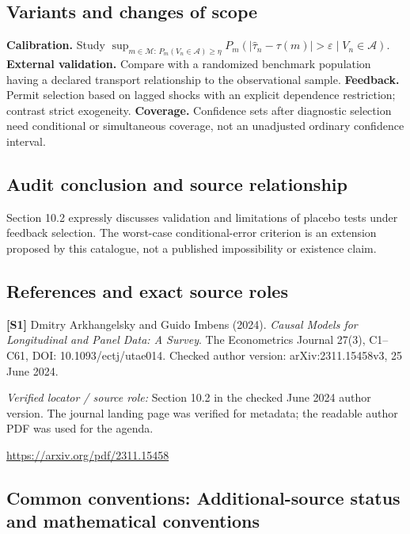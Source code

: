 \documentclass[11pt,a4paper]{article}
\begin{document}
\subsection*{Variants and changes of scope}

\textbf{Calibration.} Study $\sup_{m\in\mathcal M:\,P_m(V_n\in\mathcal A)\geq\eta}P_m(|\widehat\tau_n-\tau(m)|>\varepsilon\mid V_n\in\mathcal A)$. \textbf{External validation.} Compare with a randomized benchmark population having a declared transport relationship to the observational sample. \textbf{Feedback.} Permit selection based on lagged shocks with an explicit dependence restriction; contrast strict exogeneity. \textbf{Coverage.} Confidence sets after diagnostic selection need conditional or simultaneous coverage, not an unadjusted ordinary confidence interval.

\subsection*{Audit conclusion and source relationship}

Section 10.2 expressly discusses validation and limitations of placebo tests under feedback selection. The worst-case conditional-error criterion is an extension proposed by this catalogue, not a published impossibility or existence claim.

\subsection*{References and exact source roles}

{\footnotesize\raggedright
\par\noindent\textbf{[S1]} Dmitry Arkhangelsky and Guido Imbens (2024). \emph{Causal Models for Longitudinal and Panel Data: A Survey}. The Econometrics Journal 27(3), C1--C61, DOI: 10.1093/ectj/utae014. Checked author version: arXiv:2311.15458v3, 25 June 2024.\par \textit{Verified locator / source role:} Section 10.2 in the checked June 2024 author version. The journal landing page was verified for metadata; the readable author PDF was used for the agenda.\par \url{https://arxiv.org/pdf/2311.15458}\par\smallskip
}

\subsection*{Common conventions: Additional-source status and mathematical conventions}
\end{document}
